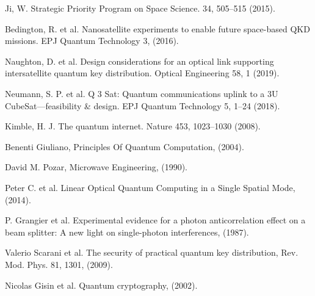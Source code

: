 \begin{thebibliography}{99}
  Ji,
  W. Strategic Priority Program on Space Science. 34,
  505–515 (2015).

  Bedington,
  R. et al. Nanosatellite experiments to enable future space-based QKD missions. EPJ Quantum Technology 3,
  (2016).

  Naughton,
  D. et al. Design considerations for an optical link supporting intersatellite quantum key distribution. Optical Engineering 58,
  1 (2019).

  Neumann,
  S. P. et al. Q 3 Sat: Quantum communications uplink to a 3U CubeSat—feasibility \& design. EPJ Quantum Technology 5,
  1–24 (2018).

  Kimble,
  H. J. The quantum internet. Nature 453,
  1023–1030 (2008).

  Benenti Giuliano,
  Principles Of Quantum Computation,
  (2004).

  David M. Pozar,
  Microwave Engineering,
  (1990).

  Peter C. et al.
  Linear Optical Quantum Computing in a Single Spatial Mode,
  (2014).

  P. Grangier et al.
  Experimental evidence for a photon anticorrelation effect on a beam splitter: A new light on single-photon interferences,
  (1987).

  Valerio Scarani et al.
  The security of practical quantum key distribution,
  Rev. Mod. Phys. 81, 1301,
  (2009).

  Nicolas Gisin et al.
  Quantum cryptography,
  (2002).

\end{thebibliography}
